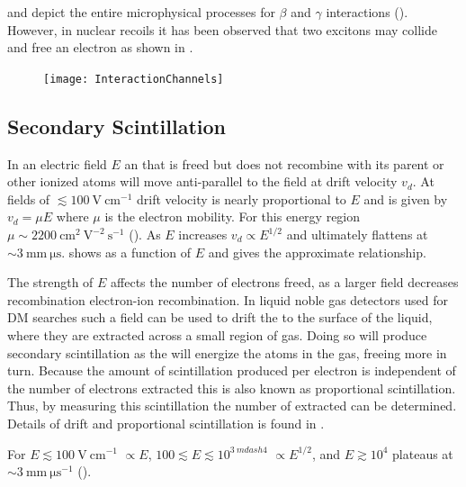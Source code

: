  and 
depict the entire microphysical processes for $\beta$ and $\gamma$ interactions ().  However, in nuclear recoils
it has been observed that two excitons may collide and free an electron as shown in .

\begin{figure}
\centering
\texttt{[image: InteractionChannels]}
\label{fig:interaction_channels}
\end{figure}


\subsection{Secondary Scintillation}
\label{subsec:secondary}
In an electric field $E$ an \electron that is freed but does not recombine with its parent or other ionized atoms will move anti-parallel
to the field at drift velocity $v_{d}$.  At fields of $\lesssim 100\ \mathrm{V\ cm^{-1}}$ drift velocity is nearly proportional to
$E$ and is given by $v_{d} = \mu E$
where $\mu$ is the electron mobility.  For this energy region $\mu \sim 2200\ \mathrm{cm^{2}\ V^{-2}\ s^{-1}}$ ().  As
$E$ increases $v_{d} \propto E^{1/2}$ and ultimately flattens at ${\sim} 3\ \mathrm{mm\ \mu s}$.   shows \vd
as a function of $E$ and  gives the approximate relationship.

The strength of $E$ affects the number of electrons freed, as a larger field decreases
recombination electron-ion recombination.  In liquid noble gas detectors used for DM searches such a field can be used to drift the
\electron to the surface of the liquid, where they are extracted across a small region of gas.  Doing so will produce secondary
scintillation as the \electron will energize the atoms in the gas, freeing more \electron in turn.  Because the amount of scintillation
produced per electron is independent of the number of electrons extracted this is also known as proportional scintillation.  Thus, by
measuring this scintillation the number of \electron extracted can be determined.  Details of \electron drift and proportional
scintillation is found in .

For $E \lesssim 100\ \mathrm{V\ cm^{-1}}$ \vd$\propto E$, $100 \lesssim E \lesssim 10^{3 \ mdash 4}$
\vd$\propto E^{1/2}$, and $E \gtrsim 10^{4}$ \vd plateaus at $\sim 3\ \mathrm{mm\ \mu s^{-1}}$ ().

